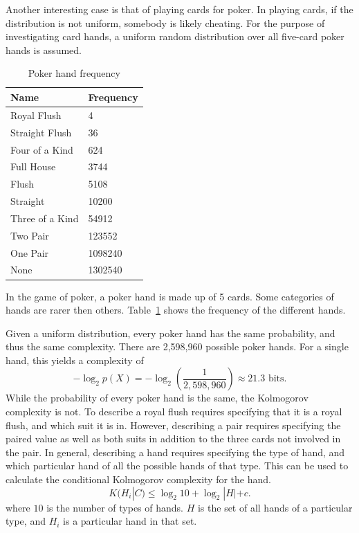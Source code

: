 Another interesting case is that of playing cards for poker.
In playing cards, if the distribution is not uniform, somebody is likely cheating.
For the purpose of investigating card hands, a uniform random distribution over all five-card poker hands is assumed.

\begin{table}
    \begin{center}
    \begin{tabular}{ll}
        Name & Frequency \\
        \hline
        Royal Flush & 4 \\
        Straight Flush & 36 \\
        Four of a Kind & 624 \\
          Full House & 3744 \\
               Flush & 5108 \\
            Straight & 10200 \\
     Three of a Kind & 54912 \\
            Two Pair & 123552 \\
            One Pair & 1098240 \\
            None & 1302540 \\
    \end{tabular}
    \end{center}
    \caption{Poker hand frequency}
    \label{poker}
\end{table}
In the game of poker,
a poker hand is made up of 5 cards.
Some categories of hands are rarer then others.
Table~\ref{poker} shows the frequency of the different hands.

Given a uniform distribution, every poker hand has the same probability, and thus the same complexity.
There are 2,598,960 possible poker hands. 
For a single hand, this yields a complexity of
\begin{equation}
    -\log_2{p(X)} = -\log_2(\frac{1}{2,598,960}) \approx 21.3 \mbox{ bits.}
\end{equation}
While the probability of every poker hand is the same, the Kolmogorov complexity is not.
To describe a royal flush requires specifying that it is a royal flush, and which suit it is in.
However, describing a pair requires specifying the paired value as well as both suits in addition to the three cards not involved in the pair.
In general, describing a hand requires specifying the type of hand, and which particular hand of all the possible hands of that type.
This can be used to calculate the conditional Kolmogorov complexity for the hand.
\begin{equation}
    \label{kc.card}
    K(H_i|C) \leq \log_2 10 + \log_2 |H| + c \mbox{.}
\end{equation} where $10$ is the number of types of hands. $H$ is the set of all hands of a particular type, and $H_i$ is a particular hand in that set.

